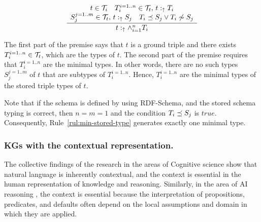 \documentclass[runningheads]{llncs}
\newcommand{\uarr}{\uparrow}
\newcommand{\TT}{{\cal T}}
\newcommand{\memo}[1]{}
\begin{document}
\begin{equation}
\label{rul:min-stored-type}
\dfrac{\begin{array}{c}
         t\in\TT_i\quad T_i^{i=1..n}\in\TT_t,\, t:_\uarr\/T_i \\
         S_j^{j=1..m}\in\TT_t,\, t:_\uarr\/S_j\quad T_i\preceq\/S_j\lor\/T_i\not\sim\/S_j
       \end{array}}
      {t:_{\uarr}\land_{i=1}^n\/T_i}
\end{equation}

The first part of the premise says that $t$ is a ground triple and
there exists $T_i^{i=1..n}\in\TT_t$, which are the types of $t$. The
second part of the premise requires that $T_i^{i=1..n}$ are the
minimal types. In other words, there are no such types $S_j^{j=1..m}$
of $t$ that are subtypes of $T_i^{i=1..n}$. Hence, $T_i^{i=1..n}$ are
the minimal types of the stored triple types of $t$.

Note that if the schema is defined by using RDF-Schema, and the stored
schema typing is correct, then $n=m=1$ and the condition
$T_i\preceq\/S_j$ is $true$. Consequently,
Rule~\ref{rul:min-stored-type} generates exactly one minimal type.

\memo{
Furthermore, under the restrictions of RDF-Schema, we can
not define a predicate $p$ with two meanings. If we were to specify two
different domains or ranges of $p$, then the reasoner would treat the
domain and range types as $\land$-types. Each instance of the domain
(range) type has to be an instance of all specified types of the
domain (range).}

% 



\subsubsection{KGs with the contextual representation.}

The collective findings of the research in the areas of Cognitive
science \cite{Stenning2008,Hollister2017} show that natural language
is inherently contextual, and the context is essential in the human
representation of knowledge and reasoning. Similarly, in the area of
AI reasoning \cite{McCarthy1993,Ghidini2001,Brewka2007}, the context
is essential because the interpretation of propositions, predicates,
and defaults often depend on the local assumptions and domain in which
they are applied.
\end{document}
